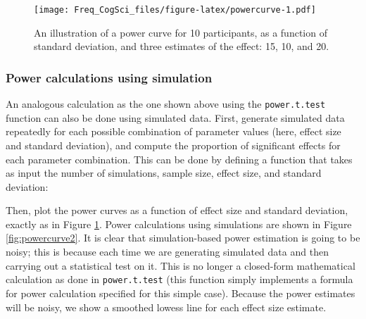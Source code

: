 \documentclass[12pt,]{krantz}
\newenvironment{Shaded}{\begin{snugshade}}{\end{snugshade}}
\newcommand{\CommentTok}[1]{\textcolor[rgb]{0.56,0.35,0.01}{\textit{#1}}}
\newcommand{\ControlFlowTok}[1]{\textcolor[rgb]{0.13,0.29,0.53}{\textbf{#1}}}
\newcommand{\DataTypeTok}[1]{\textcolor[rgb]{0.13,0.29,0.53}{#1}}
\newcommand{\DecValTok}[1]{\textcolor[rgb]{0.00,0.00,0.81}{#1}}
\newcommand{\KeywordTok}[1]{\textcolor[rgb]{0.13,0.29,0.53}{\textbf{#1}}}
\newcommand{\NormalTok}[1]{#1}
\newcommand{\OperatorTok}[1]{\textcolor[rgb]{0.81,0.36,0.00}{\textbf{#1}}}
\newcommand{\OtherTok}[1]{\textcolor[rgb]{0.56,0.35,0.01}{#1}}
\begin{document}
\begin{figure}
\centering
\texttt{[image: Freq\_CogSci\_files/figure-latex/powercurve-1.pdf]}
\caption{\label{fig:powercurve}An illustration of a power curve for 10 participants, as a function of standard deviation, and three estimates of the effect: 15, 10, and 20.}
\end{figure}

\hypertarget{power-calculations-using-simulation}{%
\subsubsection{Power calculations using simulation}\label{power-calculations-using-simulation}}

An analogous calculation as the one shown above using the \texttt{power.t.test} function can also be done using simulated data.
First, generate simulated data repeatedly for each possible combination of parameter values (here, effect size and standard deviation), and compute the proportion of significant effects for each parameter combination. This can be done by defining a function that takes as input the number of simulations, sample size, effect size, and standard deviation:

\begin{Shaded}
\end{Shaded}

Then, plot the power curves as a function of effect size and standard deviation, exactly as in Figure \ref{fig:powercurve}. Power calculations using simulations are shown in Figure \ref{fig:powercurve2}. It is clear that simulation-based power estimation is going to be noisy; this is because each time we are generating simulated data and then carrying out a statistical test on it. This is no longer a closed-form mathematical calculation as done in \texttt{power.t.test} (this function simply implements a formula for power calculation specified for this simple case). Because the power estimates will be noisy, we show a smoothed lowess line for each effect size estimate.
\end{document}
